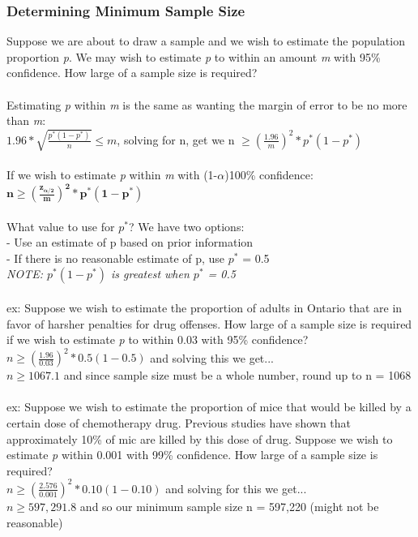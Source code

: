 \documentclass[12pt, a4paper]{article}
\begin{document}
	\subsubsection{Determining Minimum Sample Size}
	Suppose we are about to draw a sample and we wish to estimate the population proportion \textit{p}. We may wish to estimate \textit{p} to within an amount \textit{m} with 95\% confidence. How large of a sample size is required? \\~\\
	Estimating \textit{p} within \textit{m} is the same as wanting the margin of error to be no more than \textit{m}: \\
	$1.96 * \sqrt{\frac{p^*(1-p^*)}{n}} \leq m$, solving for n, get we n $\geq (\frac{1.96}{m})^2* p^*(1-p^*)$ \\~\\
	If we wish to estimate \textit{p} within \textit{m} with (1-$\alpha$)100\% confidence: $\bm{n \geq (\frac{z_{\alpha/2}}{m})^2* p^*(1-p^*)}$\\~\\
	What value to use for $p^*$? We have two options: \\
	- Use an estimate of p based on prior information \\
	- If there is no reasonable estimate of p, use $p^*$ = 0.5 \\
	\hspace*{3mm} \textit{NOTE: $p^*(1-p^*)$ is greatest when $p^*$ = 0.5} \\~\\
	ex: Suppose we wish to estimate the proportion of adults in Ontario that are in favor of harsher penalties for drug offenses. How large of a sample size is required if we wish to estimate \textit{p} to within 0.03 with 95\% confidence? \\
	$n \geq (\frac{1.96}{0.03})^2 * 0.5(1-0.5)$ and solving this we get... \\
	$n \geq 1067.1$ and since sample size must be a whole number, round up to n = 1068 \\~\\
	ex: Suppose we wish to estimate the proportion of mice that would be killed by a certain dose of chemotherapy drug. Previous studies have shown that approximately 10\% of mic are killed by this dose of drug. Suppose we wish to estimate \textit{p} within 0.001 with 99\% confidence. How large of a sample size is required? \\
	$n \geq (\frac{2.576}{0.001})^2 * 0.10(1-0.10)$ and solving for this we get... \\
	$n \geq 597,291.8$ and so our minimum sample size n = 597,220 (might not be reasonable) \\~\\
	
\end{document}
